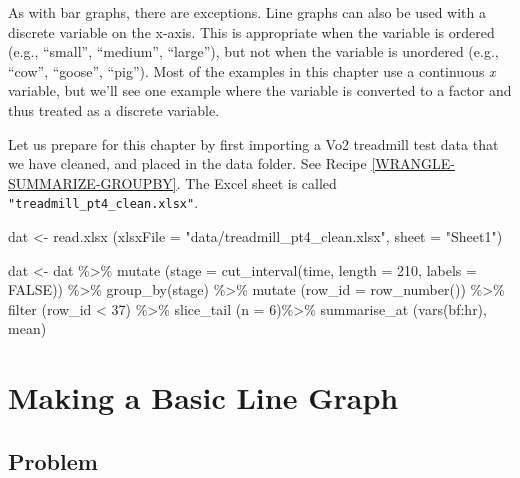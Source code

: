 \documentclass[
]{book}
\newenvironment{Shaded}{\begin{snugshade}}{\end{snugshade}}
\newcommand{\AttributeTok}[1]{\textcolor[rgb]{0.77,0.63,0.00}{#1}}
\newcommand{\ConstantTok}[1]{\textcolor[rgb]{0.00,0.00,0.00}{#1}}
\newcommand{\DecValTok}[1]{\textcolor[rgb]{0.00,0.00,0.81}{#1}}
\newcommand{\FunctionTok}[1]{\textcolor[rgb]{0.00,0.00,0.00}{#1}}
\newcommand{\NormalTok}[1]{#1}
\newcommand{\OtherTok}[1]{\textcolor[rgb]{0.56,0.35,0.01}{#1}}
\newcommand{\SpecialCharTok}[1]{\textcolor[rgb]{0.00,0.00,0.00}{#1}}
\newcommand{\StringTok}[1]{\textcolor[rgb]{0.31,0.60,0.02}{#1}}
\begin{document}
As with bar graphs, there are exceptions. Line graphs can also be used with a discrete variable on the x-axis. This is appropriate when the variable is ordered (e.g., ``small'', ``medium'', ``large''), but not when the variable is unordered (e.g., ``cow'', ``goose'', ``pig''). Most of the examples in this chapter use a continuous \emph{x} variable, but we'll see one example where the variable is converted to a factor and thus treated as a discrete variable.

Let us prepare for this chapter by first importing a Vo2 treadmill test data that we have cleaned, and placed in the data folder. See Recipe \ref{WRANGLE-SUMMARIZE-GROUPBY}. The Excel sheet is called \texttt{"treadmill\_pt4\_clean.xlsx"}.

\begin{Shaded}
\begin{Highlighting}[]
\NormalTok{dat }\OtherTok{\textless{}{-}}  \FunctionTok{read.xlsx}\NormalTok{ (}\AttributeTok{xlsxFile =} \StringTok{"data/treadmill\_pt4\_clean.xlsx"}\NormalTok{,}
                   \AttributeTok{sheet =} \StringTok{"Sheet1"}\NormalTok{)}

\NormalTok{dat }\OtherTok{\textless{}{-}}\NormalTok{ dat }\SpecialCharTok{\%\textgreater{}\%}
  \FunctionTok{mutate}\NormalTok{ (}\AttributeTok{stage =} \FunctionTok{cut\_interval}\NormalTok{(time, }\AttributeTok{length =} \DecValTok{210}\NormalTok{, }\AttributeTok{labels =} \ConstantTok{FALSE}\NormalTok{)) }\SpecialCharTok{\%\textgreater{}\%}
  \FunctionTok{group\_by}\NormalTok{(stage) }\SpecialCharTok{\%\textgreater{}\%}
  \FunctionTok{mutate}\NormalTok{ (}\AttributeTok{row\_id =} \FunctionTok{row\_number}\NormalTok{()) }\SpecialCharTok{\%\textgreater{}\%}
  \FunctionTok{filter}\NormalTok{ (row\_id }\SpecialCharTok{\textless{}} \DecValTok{37}\NormalTok{) }\SpecialCharTok{\%\textgreater{}\%}
  \FunctionTok{slice\_tail}\NormalTok{ (}\AttributeTok{n =} \DecValTok{6}\NormalTok{)}\SpecialCharTok{\%\textgreater{}\%}
  \FunctionTok{summarise\_at}\NormalTok{ (}\FunctionTok{vars}\NormalTok{(bf}\SpecialCharTok{:}\NormalTok{hr), mean)}
\end{Highlighting}
\end{Shaded}

\hypertarget{LINE-GRAPH-BASIC-LINE}{%
\section{Making a Basic Line Graph}\label{LINE-GRAPH-BASIC-LINE}}

\hypertarget{problem-22}{%
\subsection{Problem}\label{problem-22}}
\end{document}
